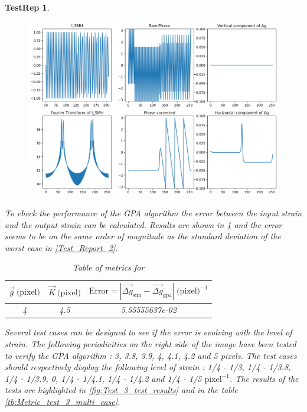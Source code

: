 \documentclass[12pt, titlepage]{article}
\newtheorem{TestRep}{TestRep}
\begin{document}
\begin{TestRep}
\begin{figure}[H]
\begin{center}
\includegraphics[scale=0.5]{Figures/Test_3_explanation_1D.png}
\caption{}
\label{fig:Test_3_explanation_1D}
\end{center}
\end{figure}

To check the performance of the GPA algorithm the error between the input strain and the output strain can be calculated. Results are shown in \cref{tb:Metric_test_3_single_case} and the error seems to be on the same order of magnitude as the standard deviation of the worst case in \cref{Test_Report_2}.

\begin{table}[H]
\centering
\begin{tabular}{|c|c|c|}
\hline
$\overrightarrow{g} \ \text{(pixel)}$ & $\overrightarrow{K} \ \text{(pixel)}$ & $\text{Error}=|\overrightarrow{\Delta g}_{\text{sim}}-\overrightarrow{\Delta g}_{\text{gpa}}| \ \text{(pixel)}^{-1}$ \\
\hline
4 & 4.5 & 5.55555637e-02 \\ \hline
\end{tabular}
\caption{Table of metrics for}\label{tb:Metric_test_3_single_case}
\end{table}

Several test cases can be designed to see if the error is evolving with the level of strain. The following periodicities on the right side of the image have been tested to verify the GPA algorithm : 3, 3.8, 3.9, 4, 4.1, 4.2 and 5 pixels. The test cases should respectively display the following level of strain : 1/4 - 1/3, 1/4 - 1/3.8, 1/4 - 1/3.9, 0, 1/4 - 1/4.1, 1/4 - 1/4.2 and 1/4 - 1/5 $\text{pixel}^{-1}$. The results of the tests are highlighted in \cref{fig:Test_3_test_results} and in the table \cref{tb:Metric_test_3_multi_case}. 


\end{TestRep}
\end{document}
